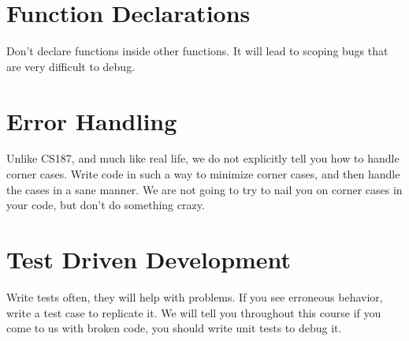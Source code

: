 \section{Function Declarations}
Don't declare functions inside other functions. It will lead to scoping bugs that
are very difficult to debug.
	
\section{Error Handling}
Unlike CS187, and much like real life, we do not explicitly tell you how to handle corner
cases. Write code in such a way to minimize corner cases, and then handle the cases
in a sane manner. We are not going to try to nail you on corner cases in your code,
but don't do something crazy.
		
\section{Test Driven Development}
Write tests often, they will help with problems. If you see erroneous behavior,
write a test case to replicate it. We will tell you throughout this course if
you come to us with broken code, you should write unit tests to debug it.
